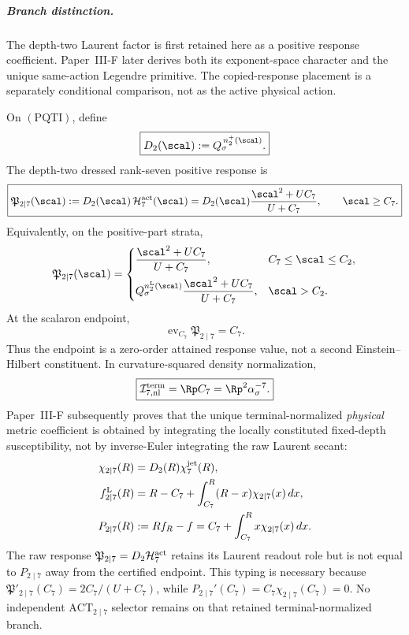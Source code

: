 \documentclass[11pt,a4paper]{article}
\begin{document}
\subparagraph{Branch distinction.}
The depth-two Laurent factor is first retained here as a positive response
coefficient.  Paper~III-F later derives both its exponent-space character
and the unique same-action Legendre primitive.  The copied-response placement
is a separately conditional comparison,
not as the active physical action.

\begin{theorem}
\label{p3e:thm:raw-complementary-laurent-action}
On \((\mathrm{PQTI})\), define
\begin{equation}
\label{p3e:eq:laur17-dressing}
 \boxed{D_2(\scal):=Q_\sigma^{\,n_2^+(\scal)}.}
\end{equation}
The depth-two dressed rank-seven positive response is
\begin{equation}
\label{p3e:eq:raw-complementary-laurent-action}
 \boxed{
 \mathfrak P_{2\mid7}(\scal)
 :=D_2(\scal)\,\mathcal H_7^{\rm act}(\scal)
 =D_2(\scal)\frac{\scal^2+UC_7}{U+C_7},
 \qquad \scal\ge C_7.}
\end{equation}
Equivalently, on the positive-part strata,
\begin{equation}
\label{p3e:eq:raw-complementary-laurent-expanded}
 \mathfrak P_{2\mid7}(\scal)=
 \begin{cases}
 \dfrac{\scal^2+UC_7}{U+C_7},&C_7\le\scal\le C_2,\\[3mm]
 Q_\sigma^{n_2^{\rm L}(\scal)}
 \dfrac{\scal^2+UC_7}{U+C_7},&\scal>C_2.
 \end{cases}
\end{equation}
At the scalaron endpoint,
\begin{equation}
\label{p3e:eq:laur17-terminal-role-quotient}
 \boxed{\operatorname{ev}_{C_7}\mathfrak P_{2\mid7}=C_7.}
\end{equation}
Thus the endpoint is a zero-order attained response value, not a second
Einstein--Hilbert constituent.  In curvature-squared density normalization,
\begin{equation}
\label{p3e:eq:laur17-no-second-EH-density}
 \boxed{\mathcal I_{7,\rm nl}^{\rm term}=\Rp C_7
 =\Rp^2\alpha_\sigma^{-7}.}
\end{equation}
Paper~III-F subsequently proves that the unique terminal-normalized
\emph{physical} metric coefficient is obtained by integrating the locally
constituted fixed-depth susceptibility, not by inverse-Euler integrating
the raw Laurent secant:
\[
 \begin{aligned}
 \chi_{2\mid7}(R)&=D_2(R)\chi_7^{\rm jet}(R),\\
 f^{\rm L}_{2\mid7}(R)&=R-C_7+\int_{C_7}^R(R-x)\chi_{2\mid7}(x)\,dx,\\
 P_{2\mid7}(R)&:=Rf_R-f
 =C_7+\int_{C_7}^Rx\chi_{2\mid7}(x)\,dx.
 \end{aligned}
\]
The raw response \(\mathfrak P_{2\mid7}=D_2\mathcal H_7^{\rm act}\)
retains its Laurent readout role but is not equal to
\(P_{2\mid7}\) away from the certified endpoint.  This typing is
necessary because \(\mathfrak P'_{2\mid7}(C_7)=2C_7/(U+C_7)\),
while \(P_{2\mid7}'(C_7)=C_7\chi_{2\mid7}(C_7)=0\).
No independent \(\mathrm{ACT}_{2\mid7}\) selector remains on that retained
terminal-normalized branch.
\end{theorem}
\end{document}
